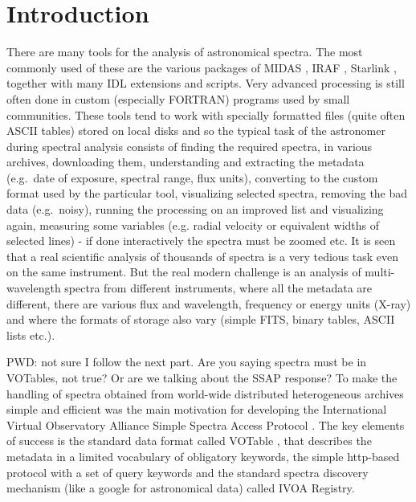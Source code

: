 \documentclass[final,authoryear,5p,times,twocolumn]{elsarticle}
\begin{document}
\newcommand{\qjras}{QJRAS}

\newcommand{\ascl}[1]{\href{http://www.ascl.net/#1}{ascl:#1}}

\section{Introduction}

There are many tools for the analysis of astronomical spectra.
The most commonly used of these are the various packages of
MIDAS \citep[][\ascl{1302.017}]{1992ASPC...25..115W}, IRAF
\citep[][\ascl{9911.002}]{2012ASPC..461..595F}, Starlink
\citep[][\ascl{1110.012}]{1982QJRAS..23..485D}, together
with many IDL extensions and scripts. Very advanced processing
is still often done in custom (especially FORTRAN) programs
used by small communities.  These tools tend to work with
specially formatted files (quite often ASCII tables) stored on
local disks and so the typical task of the astronomer during spectral
analysis consists of finding the required spectra, in various archives,
downloading them, understanding and extracting the metadata (e.g.\ date of
exposure, spectral range, flux units), converting to the custom format used
by the particular tool, visualizing selected spectra, removing the bad
data (e.g.\ noisy), running the processing on an improved list and visualizing
again, measuring some variables (e.g. radial velocity or equivalent
widths of selected lines) - if done interactively the spectra must be
zoomed etc.  It is seen that a real scientific analysis of thousands
of spectra is a very tedious task even on the same instrument. But the
real modern challenge is an analysis of multi-wavelength spectra from
different instruments, where all the metadata are different, there are
various flux and wavelength, frequency or energy units (X-ray) and
where the formats of storage also vary (simple FITS, binary tables, ASCII
lists etc.).

{\color{red} PWD: not sure I follow the next part. Are you saying spectra
must be in VOTables, not true? Or are we talking about the SSAP response?
}
To make the handling of spectra obtained from world-wide distributed
heterogeneous archives simple and efficient was the main motivation for
developing the International Virtual Observatory Alliance Simple
Spectra Access Protocol \citep[IVOA SSAP;][]{ssap}. The key elements
of success is the standard data format called VOTable
\citep{2004tivo.conf..118O}, that describes the metadata in a limited
vocabulary of obligatory keywords, the simple http-based protocol with
a set of query keywords and the standard spectra discovery mechanism
(like a google for astronomical data) called IVOA Registry.
\end{document}
